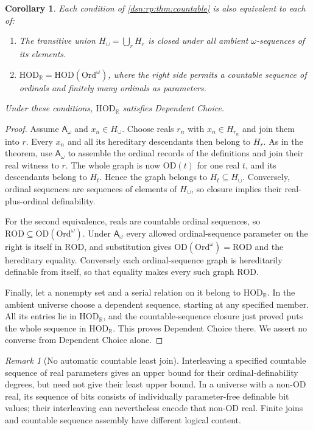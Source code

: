 \documentclass[11pt,a4paper]{article}
\numberwithin{equation}{section}
\newtheorem{corollary}[corollary]{Corollary}
\theoremstyle{definition}
\theoremstyle{remark}
\newtheorem{remark}[remark]{Remark}
\newcommand{\Ord}{\mathrm{Ord}}
\newcommand{\OD}{\mathrm{OD}}
\newcommand{\HOD}{\mathrm{HOD}}
\newcommand{\R}{\mathbb R}
\newcommand{\ROD}{\mathrm{ROD}}
\newcommand{\HR}{\HOD_{\R}}
\newcommand{\Hcup}{H_{\cup}}
\newcommand{\Asm}{\mathsf A_{\omega}}
\begin{document}
\begin{corollary}\label{dsn:rp:cor:countable-variants}
Each condition of \cref{dsn:rp:thm:countable} is also equivalent to each of:
\begin{enumerate}
\item The transitive union $\Hcup=\bigcup_r H_r$ is closed under all ambient
$\omega$-sequences of its elements.
\item $\HR=\HOD(\Ord^\omega)$, where the right side permits a countable
sequence of ordinals and finitely many ordinals as parameters.
\end{enumerate}
Under these conditions, $\HR$ satisfies Dependent Choice.
\end{corollary}
\begin{proof}
Assume $\Asm$ and $x_n\in\Hcup$. Choose reals $r_n$ with $x_n\in H_{r_n}$
and join them into $r$. Every $x_n$ and all its hereditary descendants
then belong to $H_r$. As in the theorem, use $\Asm$ to assemble the
ordinal records of the definitions and join their real witness to $r$.
The whole graph is now $\OD(t)$ for one real $t$, and its descendants
belong to $H_t$. Hence the graph belongs to $H_t\subseteq\Hcup$.
Conversely, ordinal sequences are sequences of elements of $\Hcup$,
so closure implies their real-plus-ordinal definability.

For the second equivalence, reals are countable ordinal sequences, so
$\ROD\subseteq\OD(\Ord^\omega)$. Under $\Asm$ every allowed ordinal-sequence
parameter on the right is itself in $\ROD$, and substitution gives
$\OD(\Ord^\omega)=\ROD$ and the hereditary equality. Conversely each
ordinal-sequence graph is hereditarily definable from itself, so that
equality makes every such graph $\ROD$.

Finally, let a nonempty set and a serial relation on it belong to
$\HR$. In the ambient universe choose a dependent sequence, starting
at any specified member. All its entries lie in $\HR$, and the
countable-sequence closure just proved puts the whole sequence in
$\HR$. This proves Dependent Choice there. We assert no converse from
Dependent Choice alone.
\end{proof}

\begin{remark}[No automatic countable least join]
Interleaving a specified countable sequence of real parameters gives an
upper bound for their ordinal-definability degrees, but need not give
their least upper bound. In a universe with a non-OD real, its sequence
of bits consists of individually parameter-free definable bit values;
their interleaving can nevertheless encode that non-OD real. Finite
joins and countable sequence assembly have different logical content.
\end{remark}
\end{document}

